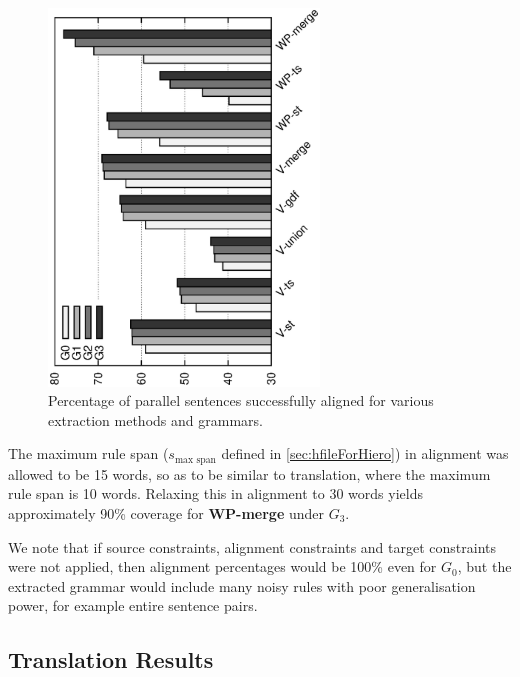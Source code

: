 \begin{figure}
  \begin{center}
    \includegraphics[width=7.2cm,angle=-90]{figures/coverage.eps}
    \caption{\label{fig:coverage} Percentage of parallel sentences successfully aligned for various extraction methods and grammars.} %
  \end{center}
\end{figure}

The maximum rule span ($s_{\text{max span}}$ defined
in \autoref{sec:hfileForHiero}) in alignment was allowed to be 15 words, so as to be
similar to translation, where the maximum rule span is 10 words. Relaxing this
in alignment to 30 words yields approximately 90\% coverage for {\bf WP-merge}
under $G_3$.

We note that if source constraints, alignment constraints and target constraints
were not applied, then alignment percentages would be 100\% even for $G_0$, but
the extracted grammar would include many noisy rules with poor generalisation
power, for example entire sentence pairs.

\subsection{Translation Results}
\label{sec:extractionFromPosteriorsTranslationResults}
    
